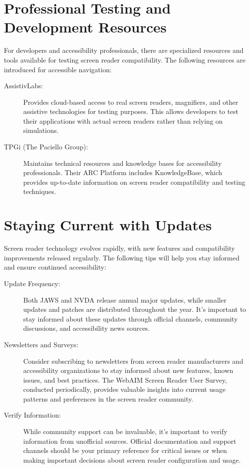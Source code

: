 \section{Professional Testing and Development Resources}
\label{testing}
For developers and accessibility professionals, there are specialized resources and tools available for testing screen reader compatibility. The following resources are introduced for accessible navigation:

\begin{description}
    \item[AssistivLabs:] Provides cloud-based access to real screen readers, magnifiers, and other assistive technologies for testing purposes. This allows developers to test their applications with actual screen readers rather than relying on simulations.
    \item[TPGi (The Paciello Group):] Maintains technical resources and knowledge bases for accessibility professionals. Their ARC Platform includes KnowledgeBase, which provides up-to-date information on screen reader compatibility and testing techniques.
\end{description}

\section{Staying Current with Updates}
\label{updates}
Screen reader technology evolves rapidly, with new features and compatibility improvements released regularly. The following tips will help you stay informed and ensure continued accessibility:

\begin{description}
    \item[Update Frequency:] Both JAWS and NVDA release annual major updates, while smaller updates and patches are distributed throughout the year. It's important to stay informed about these updates through official channels, community discussions, and accessibility news sources.
    \item[Newsletters and Surveys:] Consider subscribing to newsletters from screen reader manufacturers and accessibility organizations to stay informed about new features, known issues, and best practices. The WebAIM Screen Reader User Survey, conducted periodically, provides valuable insights into current usage patterns and preferences in the screen reader community.
    \item[Verify Information:] While community support can be invaluable, it's important to verify information from unofficial sources. Official documentation and support channels should be your primary reference for critical issues or when making important decisions about screen reader configuration and usage.
\end{description}

